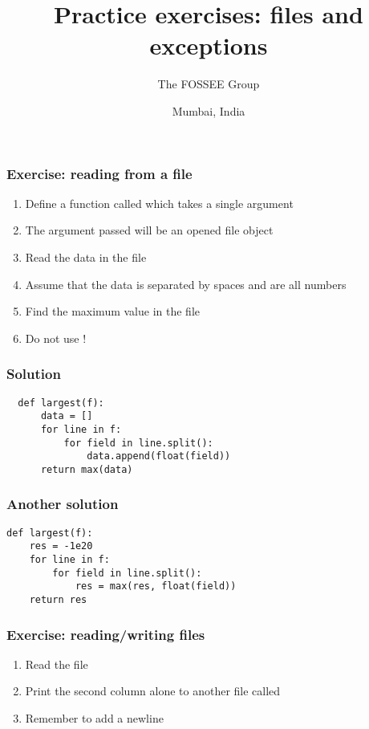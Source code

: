 \documentclass[14pt,compress]{beamer}
\title[Files/exceptions]{Practice exercises: files and exceptions}
\author[FOSSEE Team] {The FOSSEE Group}
\institute[FOSSEE -- IITB] {Department of Aerospace Engineering\\IIT Bombay}
\date[] {Mumbai, India}
\begin{document}
\begin{frame}
  \titlepage
\end{frame}


\begin{frame}[plain]
  \frametitle{Exercise: reading from a file}
  \begin{enumerate}
  \item Define a function called  which takes a single argument
  \item The argument passed will be an opened file object
  \item Read the data in the file
  \item Assume that the data is separated by spaces and are all numbers
  \item Find the maximum value in the file
  \item Do not use !
  \end{enumerate}
\end{frame}

\begin{frame}
\frametitle{Solution}
\begin{lstlisting}
  def largest(f):
      data = []
      for line in f:
          for field in line.split():
              data.append(float(field))
      return max(data)

\end{lstlisting}
\end{frame}

\begin{frame}
\frametitle{Another solution}
\begin{lstlisting}
def largest(f):
    res = -1e20
    for line in f:
        for field in line.split():
            res = max(res, float(field))
    return res

\end{lstlisting}
\end{frame}


\begin{frame}[plain]
  \frametitle{Exercise: reading/writing files}
  \begin{enumerate}
  \item Read the  file
  \item Print the second column alone to another file called 
  \item Remember to add a newline
  \end{enumerate}
\end{frame}
\end{document}
